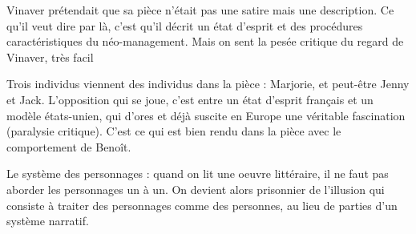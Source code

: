 \documentclass[a4paper,12pt]{book}
\begin{document}
Vinaver prétendait que sa pièce n'était pas une satire mais une description. Ce qu'il veut dire par là, c'est qu'il décrit un état d'esprit et des procédures caractéristiques du néo-management. Mais on sent la pesée critique du regard de Vinaver, très facil
\par Trois individus viennent des individus dans la pièce : Marjorie, et peut-être Jenny et Jack. L'opposition qui se joue, c'est entre un état d'esprit français et un modèle états-unien, qui d'ores et déjà suscite en Europe une véritable fascination (paralysie critique). C'est ce qui est bien rendu dans la pièce avec le comportement de Benoît.
\par Le système des personnages : quand on lit une oeuvre littéraire, il ne faut pas aborder les personnages un à un. On devient alors prisonnier de l'illusion qui consiste à traiter des personnages comme des personnes, au lieu de parties d'un système narratif.
\end{document}
